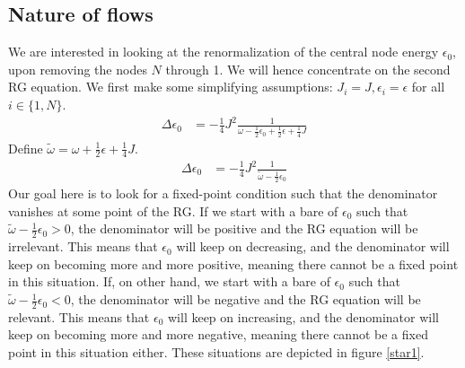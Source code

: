 \documentclass[12pt,twoside]{article}
\numberwithin{equation}{section}
\begin{document}
\subsection{Nature of flows}
We are interested in looking at the renormalization of the central node energy \(\epsilon_0\), upon removing the nodes \(N\) through 1. We will hence concentrate on the second RG equation. We first make some simplifying assumptions: \(J_i = J, \epsilon_i = \epsilon\) for all \(i\in\{1,N\}\).
\begin{equation}\begin{aligned}
	\label{stareq}
	\Delta \epsilon_0 &= -\frac{1}{4}J^2 \frac{1}{\omega - \frac{1}{2}\epsilon_0 + \frac{1}{2}\epsilon + \frac{1}{4}J}
\end{aligned}\end{equation}
Define \(\tilde\omega = \omega + \frac{1}{2}\epsilon + \frac{1}{4}J\).
\begin{equation}\begin{aligned}
	\Delta \epsilon_0 &= -\frac{1}{4}J^2 \frac{1}{\tilde \omega - \frac{1}{2}\epsilon_0}
\end{aligned}\end{equation}
Our goal here is to look for a fixed-point condition such that the denominator vanishes at some point of the RG. If we start with a bare of \(\epsilon_0\) such that \(\tilde \omega - \frac{1}{2}\epsilon_0 > 0\), the denominator will be positive and the RG equation will be irrelevant. This means that \(\epsilon_0\) will keep on decreasing, and the denominator will keep on becoming more and more positive, meaning there cannot be a fixed point in this situation.
\pb If, on other hand, we start with a bare of \(\epsilon_0\) such that \(\tilde \omega - \frac{1}{2}\epsilon_0 < 0\), the denominator will be negative and the RG equation will be relevant. This means that \(\epsilon_0\) will keep on increasing, and the denominator will keep on becoming more and more negative, meaning there cannot be a fixed point in this situation either. These situations are depicted in figure \ref{star1}.
\end{document}
